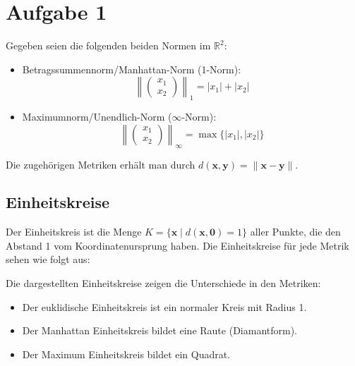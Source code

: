 
\section*{Aufgabe 1}

Gegeben seien die folgenden beiden Normen im \( \mathbb{R}^2 \):

\begin{itemize}
    \item Betragssummennorm/Manhattan-Norm (1-Norm):
    \[
    \left\| \begin{pmatrix} x_1 \\ x_2 \end{pmatrix} \right\|_1 = |x_1| + |x_2|
    \]

    \item Maximumnorm/Unendlich-Norm (\(\infty\)-Norm):
    \[
    \left\| \begin{pmatrix} x_1 \\ x_2 \end{pmatrix} \right\|_\infty = \max\{|x_1|, |x_2|\}
    \]
\end{itemize}

Die zugehörigen Metriken erhält man durch \( d(\mathbf{x}, \mathbf{y}) = \|\mathbf{x} - \mathbf{y}\| \).

\subsection*{Einheitskreise}

Der Einheitskreis ist die Menge \( K = \{\mathbf{x} \mid d(\mathbf{x}, \mathbf{0}) = 1\} \) aller Punkte, die den Abstand 1 vom Koordinatenursprung haben. Die Einheitskreise für jede Metrik sehen wie folgt aus:

\begin{center}
\end{center}

Die dargestellten Einheitskreise zeigen die Unterschiede in den Metriken:
\begin{itemize}
    \item Der euklidische Einheitskreis ist ein normaler Kreis mit Radius 1.
    \item Der Manhattan Einheitskreis bildet eine Raute (Diamantform).
    \item Der Maximum Einheitskreis bildet ein Quadrat.
\end{itemize}
